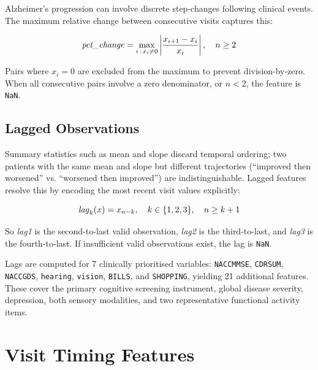 \documentclass[11pt]{article}
\begin{document}
Alzheimer's progression can involve discrete step-changes following clinical events.  The maximum relative change between consecutive visits captures this:

\begin{equation}
\text{\textit{pct\_change}} = \max_{i \,:\, x_i \neq 0} \left| \frac{x_{i+1} - x_i}{x_i} \right|, \quad n \geq 2
\label{eq:pct_change}
\end{equation}

Pairs where $x_i = 0$ are excluded from the maximum to prevent division-by-zero.  When all consecutive pairs involve a zero denominator, or $n < 2$, the feature is \texttt{NaN}.

\subsection{Lagged Observations}
\label{subsec:lags}

Summary statistics such as mean and slope discard temporal ordering; two patients with the same mean and slope but different trajectories (``improved then worsened'' vs. ``worsened then improved'') are indistinguishable.  Lagged features resolve this by encoding the most recent visit values explicitly:

\begin{equation}
\text{\textit{lag}}_{k}(x) = x_{n-k}, \quad k \in \{1, 2, 3\}, \quad n \geq k + 1
\label{eq:lag}
\end{equation}

So \textit{lag1} is the second-to-last valid observation, \textit{lag2} is the third-to-last, and \textit{lag3} is the fourth-to-last.  If insufficient valid observations exist, the lag is \texttt{NaN}.

Lags are computed for 7 clinically prioritised variables: \texttt{NACCMMSE}, \texttt{CDRSUM}, \texttt{NACCGDS}, \texttt{hearing}, \texttt{vision}, \texttt{BILLS}, and \texttt{SHOPPING}, yielding 21 additional features.  These cover the primary cognitive screening instrument, global disease severity, depression, both sensory modalities, and two representative functional activity items.

\section{Visit Timing Features}
\label{sec:timing}
\end{document}

